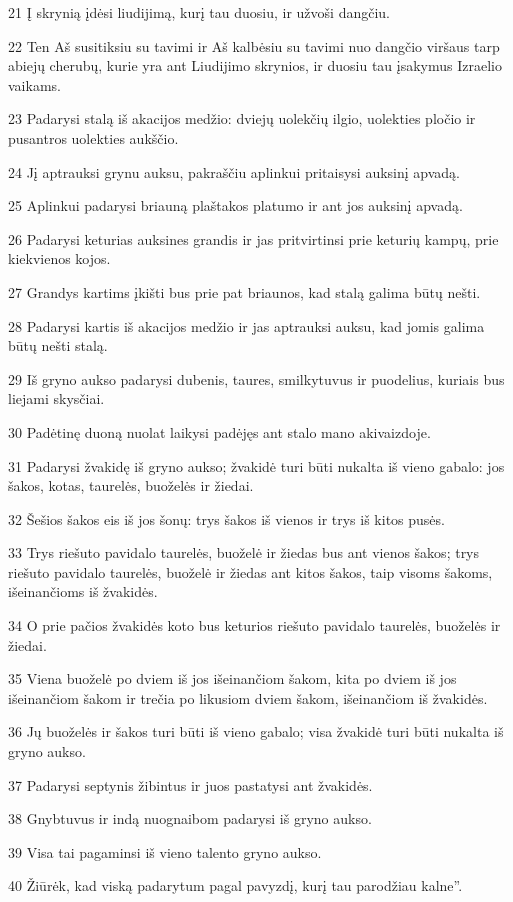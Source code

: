 \par 21 Į skrynią įdėsi liudijimą, kurį tau duosiu, ir užvoši dangčiu. 
\par 22 Ten Aš susitiksiu su tavimi ir Aš kalbėsiu su tavimi nuo dangčio viršaus tarp abiejų cherubų, kurie yra ant Liudijimo skrynios, ir duosiu tau įsakymus Izraelio vaikams. 
\par 23 Padarysi stalą iš akacijos medžio: dviejų uolekčių ilgio, uolekties pločio ir pusantros uolekties aukščio. 
\par 24 Jį aptrauksi grynu auksu, pakraščiu aplinkui pritaisysi auksinį apvadą. 
\par 25 Aplinkui padarysi briauną plaštakos platumo ir ant jos auksinį apvadą. 
\par 26 Padarysi keturias auksines grandis ir jas pritvirtinsi prie keturių kampų, prie kiekvienos kojos. 
\par 27 Grandys kartims įkišti bus prie pat briaunos, kad stalą galima būtų nešti. 
\par 28 Padarysi kartis iš akacijos medžio ir jas aptrauksi auksu, kad jomis galima būtų nešti stalą. 
\par 29 Iš gryno aukso padarysi dubenis, taures, smilkytuvus ir puodelius, kuriais bus liejami skysčiai. 
\par 30 Padėtinę duoną nuolat laikysi padėjęs ant stalo mano akivaizdoje. 
\par 31 Padarysi žvakidę iš gryno aukso; žvakidė turi būti nukalta iš vieno gabalo: jos šakos, kotas, taurelės, buoželės ir žiedai. 
\par 32 Šešios šakos eis iš jos šonų: trys šakos iš vienos ir trys iš kitos pusės. 
\par 33 Trys riešuto pavidalo taurelės, buoželė ir žiedas bus ant vienos šakos; trys riešuto pavidalo taurelės, buoželė ir žiedas ant kitos šakos, taip visoms šakoms, išeinančioms iš žvakidės. 
\par 34 O prie pačios žvakidės koto bus keturios riešuto pavidalo taurelės, buoželės ir žiedai. 
\par 35 Viena buoželė po dviem iš jos išeinančiom šakom, kita po dviem iš jos išeinančiom šakom ir trečia po likusiom dviem šakom, išeinančiom iš žvakidės. 
\par 36 Jų buoželės ir šakos turi būti iš vieno gabalo; visa žvakidė turi būti nukalta iš gryno aukso. 
\par 37 Padarysi septynis žibintus ir juos pastatysi ant žvakidės. 
\par 38 Gnybtuvus ir indą nuognaibom padarysi iš gryno aukso. 
\par 39 Visa tai pagaminsi iš vieno talento gryno aukso. 
\par 40 Žiūrėk, kad viską padarytum pagal pavyzdį, kurį tau parodžiau kalne”.




